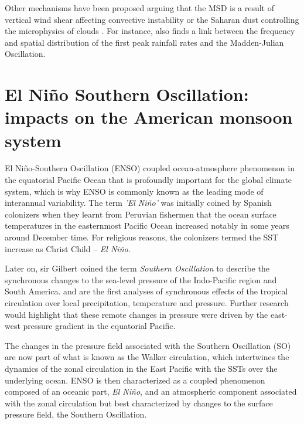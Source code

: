 Other mechanisms have been proposed arguing that the MSD is a result of vertical wind shear affecting convective instability or the Saharan dust controlling  the microphysics of clouds \citep{angeles2010origins}.
For instance, \cite{perdigon2019} also finds a link between the frequency and spatial distribution of the first peak rainfall rates and the Madden-Julian Oscillation. 

\section{El Niño Southern Oscillation: impacts on the American monsoon system}
\label{sub:lit_enso}



 El Niño-Southern Oscillation (ENSO) coupled ocean-atmosphere phenomenon in the equatorial Pacific Ocean that is profoundly important for the global climate system, which is why ENSO is commonly known as the leading mode of interannual variability. 
 The term \textit{'El Niño'} was initially coined by Spanish colonizers when they learnt from Peruvian fishermen that the ocean surface temperatures in the easternmost Pacific Ocean increased notably in some years around December time. 
 For religious reasons, the colonizers termed the SST increase as Christ Child -- \textit{El Niño}. 
 
 
 
  Later on, sir Gilbert \cite{walker1924} coined the term \textit{Southern Oscillation} to describe the synchronous changes to the sea-level pressure of the Indo-Pacific region and South America. 
  \cite{walker1924} and \cite{walker1932} are the first analyses of synchronous effects of the tropical circulation over local precipitation, temperature and pressure. Further research \citep[e.g.][]{troup1965} would highlight that these remote changes in pressure were driven by the east-west pressure gradient in the equatorial Pacific. 
  
  The changes in the pressure field associated with the Southern Oscillation (SO) are now part of what is known as the Walker circulation, which intertwines the dynamics of the zonal circulation in the East Pacific with the SSTs over the underlying ocean. ENSO is then characterized as a coupled phenomenon composed of an oceanic part, \textit{El Niño}, and an atmospheric component associated with the zonal circulation but best characterized by changes to the surface pressure field, the Southern Oscillation. 
  
